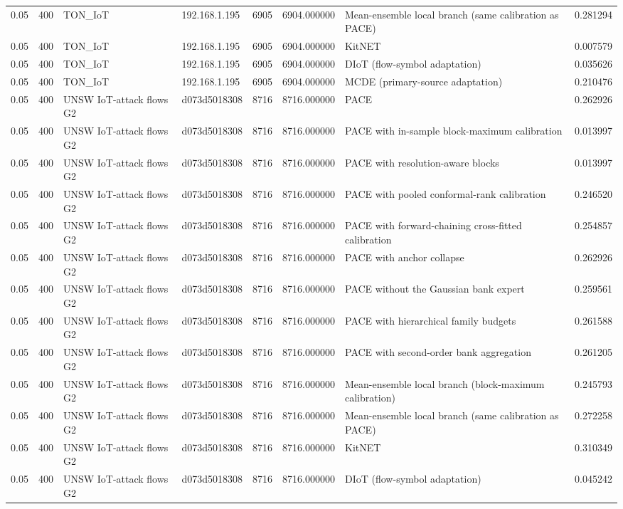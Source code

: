 \begin{tabular}{llllllll}
0.05 & 400 & TON\_IoT & 192.168.1.195 & 6905 & 6904.000000 & Mean-ensemble local branch (same calibration as PACE) & 0.281294 \\
0.05 & 400 & TON\_IoT & 192.168.1.195 & 6905 & 6904.000000 & KitNET & 0.007579 \\
0.05 & 400 & TON\_IoT & 192.168.1.195 & 6905 & 6904.000000 & DIoT (flow-symbol adaptation) & 0.035626 \\
0.05 & 400 & TON\_IoT & 192.168.1.195 & 6905 & 6904.000000 & MCDE (primary-source adaptation) & 0.210476 \\
0.05 & 400 & UNSW IoT-attack flows G2 & d073d5018308 & 8716 & 8716.000000 & PACE & 0.262926 \\
0.05 & 400 & UNSW IoT-attack flows G2 & d073d5018308 & 8716 & 8716.000000 & PACE with in-sample block-maximum calibration & 0.013997 \\
0.05 & 400 & UNSW IoT-attack flows G2 & d073d5018308 & 8716 & 8716.000000 & PACE with resolution-aware blocks & 0.013997 \\
0.05 & 400 & UNSW IoT-attack flows G2 & d073d5018308 & 8716 & 8716.000000 & PACE with pooled conformal-rank calibration & 0.246520 \\
0.05 & 400 & UNSW IoT-attack flows G2 & d073d5018308 & 8716 & 8716.000000 & PACE with forward-chaining cross-fitted calibration & 0.254857 \\
0.05 & 400 & UNSW IoT-attack flows G2 & d073d5018308 & 8716 & 8716.000000 & PACE with anchor collapse & 0.262926 \\
0.05 & 400 & UNSW IoT-attack flows G2 & d073d5018308 & 8716 & 8716.000000 & PACE without the Gaussian bank expert & 0.259561 \\
0.05 & 400 & UNSW IoT-attack flows G2 & d073d5018308 & 8716 & 8716.000000 & PACE with hierarchical family budgets & 0.261588 \\
0.05 & 400 & UNSW IoT-attack flows G2 & d073d5018308 & 8716 & 8716.000000 & PACE with second-order bank aggregation & 0.261205 \\
0.05 & 400 & UNSW IoT-attack flows G2 & d073d5018308 & 8716 & 8716.000000 & Mean-ensemble local branch (block-maximum calibration) & 0.245793 \\
0.05 & 400 & UNSW IoT-attack flows G2 & d073d5018308 & 8716 & 8716.000000 & Mean-ensemble local branch (same calibration as PACE) & 0.272258 \\
0.05 & 400 & UNSW IoT-attack flows G2 & d073d5018308 & 8716 & 8716.000000 & KitNET & 0.310349 \\
0.05 & 400 & UNSW IoT-attack flows G2 & d073d5018308 & 8716 & 8716.000000 & DIoT (flow-symbol adaptation) & 0.045242 \\

\end{tabular}
